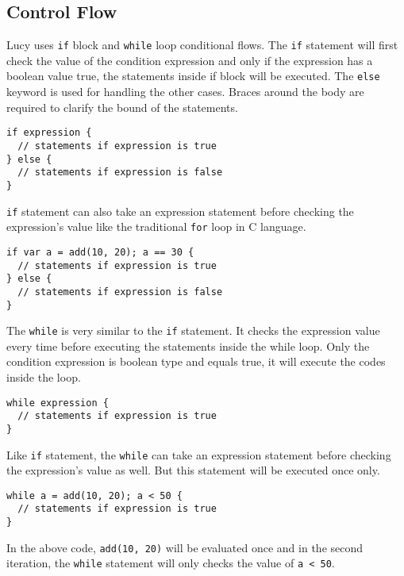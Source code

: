 \subsection{Control Flow}
Lucy uses \texttt{if} block and \texttt{while} loop conditional flows. The \texttt{if} statement will first check the value of the condition expression and only if the expression has a boolean value true, the statements inside if block will be executed. The \texttt{else} keyword is used for handling the other cases. Braces around the body are required to clarify the bound of the statements.
\begin{lstlisting}
if expression {
  // statements if expression is true
} else {
  // statements if expression is false
}
\end{lstlisting}
\texttt{if} statement can also take an expression statement before checking the expression's value like the traditional \texttt{for} loop in C language.
\begin{lstlisting}
if var a = add(10, 20); a == 30 {
  // statements if expression is true
} else {
  // statements if expression is false
}
\end{lstlisting}
The \texttt{while} is very similar to the \texttt{if} statement. It checks the expression value every time before executing the statements inside the while loop. Only the condition expression is boolean type and equals true, it will execute the codes inside the loop.
\begin{lstlisting}
while expression {
  // statements if expression is true
}
\end{lstlisting}
Like \texttt{if} statement, the \texttt{while} can take an expression statement before checking the expression's value as well. But this statement will be executed once only.
\begin{lstlisting}
while a = add(10, 20); a < 50 {
  // statements if expression is true
}
\end{lstlisting}
In the above code, \texttt{add(10, 20)} will be evaluated once and in the second iteration, the \texttt{while} statement will only checks the value of \texttt{a < 50}.

